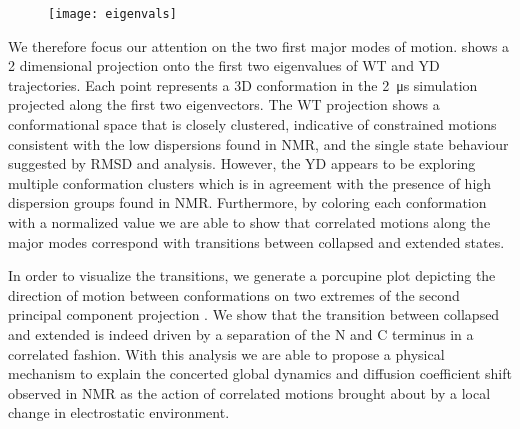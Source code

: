 \begin{figure}
\centering
	\texttt{[image: eigenvals]}
	\label{fig:eigenvalues}
\end{figure}


We therefore focus our attention on the two first major modes of motion.  shows a 2 dimensional projection onto the first two eigenvalues of WT and YD trajectories. Each point represents a 3D conformation in the \SI{2}{\us} simulation projected along the first two eigenvectors. The WT projection shows a conformational space that is closely clustered, indicative of constrained motions consistent with the low dispersions found in NMR, and the single state behaviour suggested by RMSD and \diffusion analysis. However, the YD appears to be exploring  multiple conformation clusters which is in agreement with the presence of high dispersion groups found in NMR. Furthermore, by coloring each conformation with a normalized \diffusion value we are able to show that correlated motions along the major modes correspond with transitions between collapsed and extended states. 

\begin{figure}
	\thispagestyle{empty}
	\centering     %
	\clearpage
	\label{fig:pca}
\end{figure}

In order to visualize the transitions, we generate a porcupine plot depicting the direction of motion between conformations on two extremes of the second principal component projection .  We show that the transition between collapsed and extended is indeed driven by a separation of the N and C terminus in a correlated fashion. With this analysis we are able to propose a physical mechanism to explain the concerted global dynamics and diffusion coefficient shift observed in NMR as the action of correlated motions brought about by a local change in electrostatic environment. 


